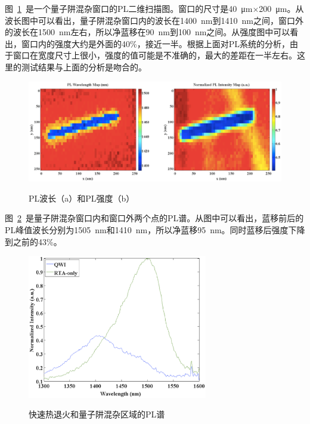 \documentclass{ZJUthesis}
\begin{document}
图~\ref{fig_single_pl}~是一个量子阱混杂窗口的PL二维扫描图。窗口的尺寸是40~μm$\times$200~μm。从波长图中可以看出，量子阱混杂窗口内的波长在1400~nm到1410~nm之间，窗口外的波长在1500~nm左右，所以净蓝移在90~nm到100~nm之间。从强度图中可以看出，窗口内的强度大约是外面的40\%，接近一半。根据上面对PL系统的分析，由于窗口在宽度尺寸上很小，强度的值可能是不准确的，最大的差距在一半左右。这里的测试结果与上面的分析是吻合的。

\begin{figure}[htbp]
  \centering
  \includegraphics[width=1.0\textwidth]{./Pictures/single_pl.eps}\\
  \caption{PL波长（a）和PL强度（b）}
  \label{fig_single_pl}
\end{figure}

图~\ref{fig_single_pl2}~是量子阱混杂窗口内和窗口外两个点的PL谱。从图中可以看出，蓝移前后的PL峰值波长分别为1505~nm和1410~nm，所以净蓝移95~nm。同时蓝移后强度下降到之前的43\%。

\begin{figure}[htbp]
  \centering
  \includegraphics[width=0.7\textwidth]{./Pictures/single_pl2.eps}\\
  \caption{快速热退火和量子阱混杂区域的PL谱}
  \label{fig_single_pl2}
\end{figure}

\end{document}
